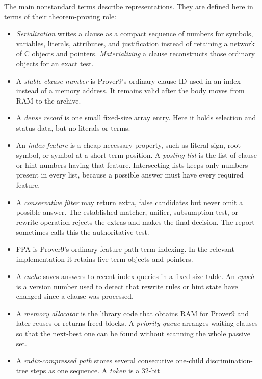 \documentclass[11pt]{article}
\begin{document}
The main nonstandard terms describe representations.  They are defined here in
terms of their theorem-proving role:
\begin{itemize}
  \item \emph{Serialization} writes a clause as a compact sequence of numbers
        for symbols, variables, literals, attributes, and justification instead
        of retaining a network of C objects and pointers.  \emph{Materializing}
        a clause reconstructs those ordinary objects for an exact test.
  \item A \emph{stable clause number} is Prover9's ordinary clause ID used in
        an index instead of a memory address.  It remains valid after the body
        moves from RAM to the archive.
  \item A \emph{dense record} is one small fixed-size array entry.  Here it
        holds selection and status data, but no literals or terms.
  \item An \emph{index feature} is a cheap necessary property, such as literal
        sign, root symbol, or symbol at a short term position.  A \emph{posting
        list} is the list of clause or hint numbers having that feature.
        Intersecting lists keeps only numbers present in every list, because a
        possible answer must have every required feature.
  \item A \emph{conservative filter} may return extra, false candidates but
        never omit a possible answer.  The established matcher, unifier,
        subsumption test, or rewrite operation rejects the extras and makes the
        final decision.  The report sometimes calls this the authoritative test.
  \item FPA is Prover9's ordinary feature-path term indexing.  In the relevant
        implementation it retains live term objects and pointers.
  \item A \emph{cache} saves answers to recent index queries in a fixed-size
        table.  An \emph{epoch} is a version number used to detect that rewrite
        rules or hint state have changed since a clause was processed.
  \item A \emph{memory allocator} is the library code that obtains RAM for
        Prover9 and later reuses or returns freed blocks.  A \emph{priority
        queue} arranges waiting clauses so that the next-best one can be found
        without scanning the whole passive set.
  \item A \emph{radix-compressed path} stores several consecutive one-child
        discrimination-tree steps as one sequence.  A \emph{token} is a 32-bit

\end{itemize}
\end{document}
